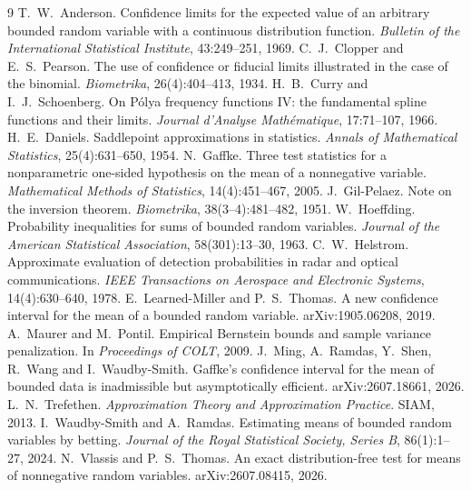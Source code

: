 \documentclass[11pt]{article}
\begin{document}
\begin{thebibliography}{9}
 T.~W.~Anderson. Confidence limits for the expected value of an arbitrary bounded random variable with a continuous distribution function. \emph{Bulletin of the International Statistical Institute}, 43:249--251, 1969.
 C.~J.~Clopper and E.~S.~Pearson. The use of confidence or fiducial limits illustrated in the case of the binomial. \emph{Biometrika}, 26(4):404--413, 1934.
 H.~B.~Curry and I.~J.~Schoenberg. On P\'olya frequency functions IV: the fundamental spline functions and their limits. \emph{Journal d'Analyse Math\'ematique}, 17:71--107, 1966.
 H.~E.~Daniels. Saddlepoint approximations in statistics. \emph{Annals of Mathematical Statistics}, 25(4):631--650, 1954.
 N.~Gaffke. Three test statistics for a nonparametric one-sided hypothesis on the mean of a nonnegative variable. \emph{Mathematical Methods of Statistics}, 14(4):451--467, 2005.
 J.~Gil-Pelaez. Note on the inversion theorem. \emph{Biometrika}, 38(3--4):481--482, 1951.
 W.~Hoeffding. Probability inequalities for sums of bounded random variables. \emph{Journal of the American Statistical Association}, 58(301):13--30, 1963.
 C.~W.~Helstrom. Approximate evaluation of detection probabilities in radar and optical communications. \emph{IEEE Transactions on Aerospace and Electronic Systems}, 14(4):630--640, 1978.
 E.~Learned-Miller and P.~S.~Thomas. A new confidence interval for the mean of a bounded random variable. arXiv:1905.06208, 2019.
 A.~Maurer and M.~Pontil. Empirical Bernstein bounds and sample variance penalization. In \emph{Proceedings of COLT}, 2009.
 J.~Ming, A.~Ramdas, Y.~Shen, R.~Wang and I.~Waudby-Smith. Gaffke's confidence interval for the mean of bounded data is inadmissible but asymptotically efficient. arXiv:2607.18661, 2026.
 L.~N.~Trefethen. \emph{Approximation Theory and Approximation Practice}. SIAM, 2013.
 I.~Waudby-Smith and A.~Ramdas. Estimating means of bounded random variables by betting. \emph{Journal of the Royal Statistical Society, Series B}, 86(1):1--27, 2024.
 N.~Vlassis and P.~S.~Thomas. An exact distribution-free test for means of nonnegative random variables. arXiv:2607.08415, 2026.
\end{thebibliography}
\end{document}
